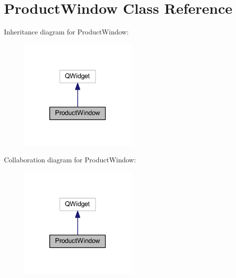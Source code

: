 \hypertarget{class_product_window}{}\section{Product\+Window Class Reference}
\label{class_product_window}


Inheritance diagram for Product\+Window\+:\nopagebreak
\begin{figure}[H]
\begin{center}
\leavevmode
\includegraphics[width=165pt]{class_product_window__inherit__graph}
\end{center}
\end{figure}


Collaboration diagram for Product\+Window\+:\nopagebreak
\begin{figure}[H]
\begin{center}
\leavevmode
\includegraphics[width=165pt]{class_product_window__coll__graph}
\end{center}
\end{figure}
